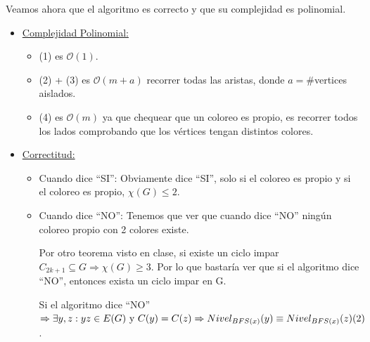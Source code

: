 \documentclass[12pt,a4paper]{report}
\begin{document}
  			\par Veamos ahora que el algoritmo es correcto y que su complejidad es polinomial.
  			\begin{itemize}
  				\item \underline{Complejidad Polinomial:}
  					\begin{itemize}
  						\item (1) es $\mathcal{O}(1)$.
  						\item (2) + (3) es $\mathcal{O}(m + a)$ recorrer todas las aristas, donde $a = \#$vertices aislados.
  						\item (4) es $\mathcal{O}(m)$ ya que chequear que un coloreo es propio, es recorrer todos los lados comprobando que los vértices tengan distintos colores.
  					\end{itemize}
  				\item \underline{Correctitud:}
  					\begin{itemize}
  						\item Cuando dice \textquotedblleft SI\textquotedblright: Obviamente dice \textquotedblleft SI\textquotedblright, solo si el coloreo es propio y si el coloreo es propio, $\chi(G) \leq 2$.
  						\item Cuando dice \textquotedblleft NO\textquotedblright: Tenemos que ver que cuando dice \textquotedblleft NO\textquotedblright \; ningún coloreo propio con 2 colores existe.

  							\vspace{5mm}
  							\par Por otro teorema visto en clase, si existe un ciclo impar $C_{2k + 1} \subseteq G \Rightarrow \chi(G) \geq 3$. Por lo que bastaría ver que si el algoritmo dice \textquotedblleft NO\textquotedblright, entonces exista un ciclo impar en G.

  							\vspace{5mm}
  							\par Si el algoritmo dice \textquotedblleft NO\textquotedblright $\Rightarrow \exists y, z : yz \in E(G) \textup{ y } C(y) = C(z) \Rightarrow Nivel_{BFS(x)}(y) \equiv Nivel_{BFS(x)}(z) (2)$.


\end{itemize}
\end{itemize}
\end{document}
